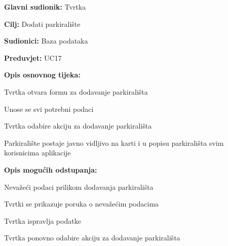 \noindent {}
\begin{packed_item}

	\item \textbf{Glavni sudionik:} Tvrtka
	\item \textbf{Cilj:} Dodati parkiralište
	\item \textbf{Sudionici:} Baza podataka
	\item \textbf{Preduvjet:} UC17
	\item \textbf{Opis osnovnog tijeka:}
	
	\item[] \begin{packed_enum}
		
		\item Tvrtka otvara formu za dodavanje parkirališta
		\item Unose se svi potrebni podaci
		\item Tvrtka odabire akciju za dodavanje parkirališta
		\item Parkiralište postaje javno vidljivo na karti i u popisu parkirališta svim korisnicima aplikacije

	\end{packed_enum}
	
	\item  \textbf{Opis mogućih odstupanja:}
	
	\item[] \begin{packed_item}
		
		\item[2.a] Nevažeći podaci prilikom dodavanja parkirališta
		\item[] \begin{packed_enum}
			
			\item Tvrtki se prikazuje poruka o nevažećim podacima
			\item Tvrtka ispravlja podatke
			\item Tvrtka ponovno odabire akciju za dodavanje parkirališta
			
		\end{packed_enum}
		
	\end{packed_item}
\end{packed_item}

\pagebreak

